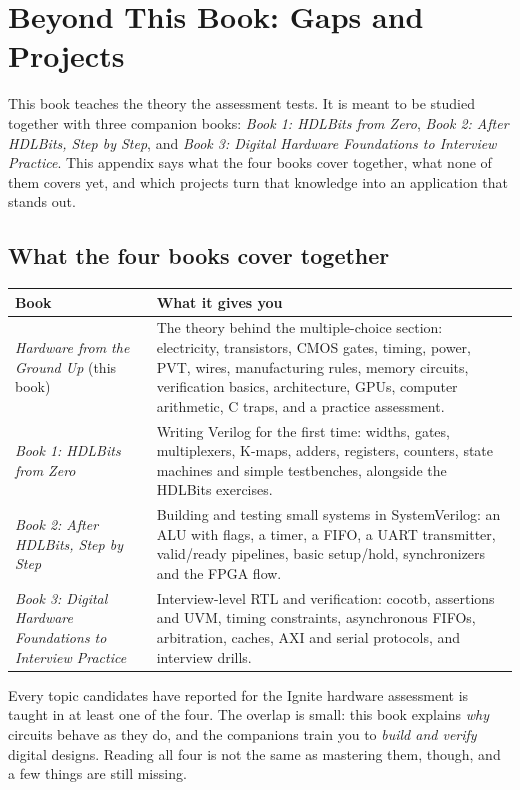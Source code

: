 \chapter{Beyond This Book: Gaps and Projects}
\label{app:projects}

This book teaches the theory the assessment tests. It is meant to be studied together with three companion books: \emph{Book 1: HDLBits from Zero}, \emph{Book 2: After HDLBits, Step by Step}, and \emph{Book 3: Digital Hardware Foundations to Interview Practice}. This appendix says what the four books cover together, what none of them covers yet, and which projects turn that knowledge into an application that stands out.

\section{What the four books cover together}

\begin{center}
\small
\begin{tabularx}{\linewidth}{>{\raggedright\arraybackslash}p{4.4cm}>{\raggedright\arraybackslash}X}
\toprule
Book & What it gives you \\
\midrule
\emph{Hardware from the Ground Up} (this book) & The theory behind the multiple-choice section: electricity, transistors, CMOS gates, timing, power, PVT, wires, manufacturing rules, memory circuits, verification basics, architecture, GPUs, computer arithmetic, C traps, and a practice assessment. \\
\emph{Book 1: HDLBits from Zero} & Writing Verilog for the first time: widths, gates, multiplexers, K-maps, adders, registers, counters, state machines and simple testbenches, alongside the HDLBits exercises. \\
\emph{Book 2: After HDLBits, Step by Step} & Building and testing small systems in SystemVerilog: an ALU with flags, a timer, a FIFO, a UART transmitter, valid/ready pipelines, basic setup/hold, synchronizers and the FPGA flow. \\
\emph{Book 3: Digital Hardware Foundations to Interview Practice} & Interview-level RTL and verification: cocotb, assertions and UVM, timing constraints, asynchronous FIFOs, arbitration, caches, AXI and serial protocols, and interview drills. \\
\bottomrule
\end{tabularx}
\end{center}

Every topic candidates have reported for the Ignite hardware assessment is taught in at least one of the four. The overlap is small: this book explains \emph{why} circuits behave as they do, and the companions train you to \emph{build and verify} digital designs. Reading all four is not the same as mastering them, though, and a few things are still missing.

